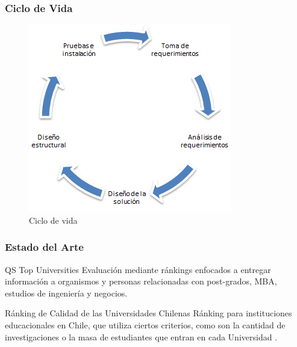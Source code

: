 \documentclass{beamer}
\begin{document}
\begin{frame}
\frametitle{Ciclo de Vida}
\begin{figure}[!hbp]
\begin{center}
\includegraphics[scale=0.6,angle=0]{images/cicloMini.PNG}
\caption{Ciclo de vida}
\label{Organigrama de rectoria}
\end{center}
\end{figure}
\end{frame}


\begin{frame}
\frametitle{Estado del Arte}
\begin{block}{QS Top Universities}
Evaluación mediante ránkings enfocados a entregar información a organismos y personas relacionadas con post-grados, MBA, estudios de ingeniería y negocios.
\end{block}
\begin{block}{Ránking de Calidad de las Universidades Chilenas}
Ránking para instituciones educacionales en Chile, que utiliza ciertos criterios, como son la cantidad de investigaciones o la masa de estudiantes que entran en cada Universidad \cite{p1}.
\end{block}
\end{frame}

\end{document}
